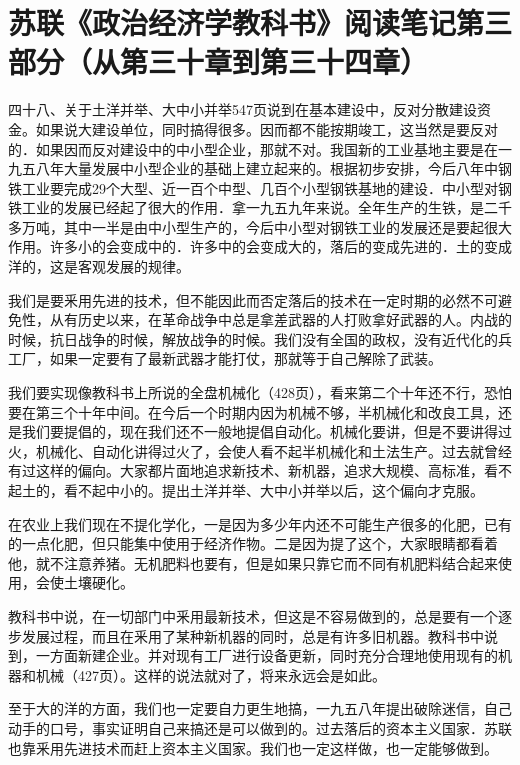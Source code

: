 \section[苏联《政治经济学教科书》阅读笔记第三部分（从第三十章到第三十四章）]{苏联《政治经济学教科书》阅读笔记第三部分（从第三十章到第三十四章）}


四十八、关于土洋并举、大中小并举547页说到在基本建设中，反对分散建设资金。如果说大建设单位，同时搞得很多。因而都不能按期竣工，这当然是要反对的．如果因而反对建设中的中小型企业，那就不对。我国新的工业基地主要是在一九五八年大量发展中小型企业的基础上建立起来的。根据初步安排，今后八年中钢铁工业要完成29个大型、近一百个中型、几百个小型钢铁基地的建设．中小型对钢铁工业的发展已经起了很大的作用．拿一九五九年来说。全年生产的生铁，是二千多万吨，其中一半是由中小型生产的，今后中小型对钢铁工业的发展还是要起很大作用。许多小的会变成中的．许多中的会变成大的，落后的变成先进的．土的变成洋的，这是客观发展的规律。

我们是要釆用先进的技术，但不能因此而否定落后的技术在一定时期的必然不可避免性，从有历史以来，在革命战争中总是拿差武器的人打败拿好武器的人。内战的时候，抗日战争的时候，解放战争的时候。我们没有全国的政权，没有近代化的兵工厂，如果一定要有了最新武器才能打仗，那就等于自己解除了武装。

我们要实现像教科书上所说的全盘机械化（428页），看来第二个十年还不行，恐怕要在第三个十年中间。在今后一个时期内因为机械不够，半机械化和改良工具，还是我们要提倡的，现在我们还不一般地提倡自动化。机械化要讲，但是不要讲得过火，机械化、自动化讲得过火了，会使人看不起半机械化和土法生产。过去就曾经有过这样的偏向。大家都片面地追求新技术、新机器，追求大规模、高标准，看不起土的，看不起中小的。提出土洋并举、大中小并举以后，这个偏向才克服。

在农业上我们现在不提化学化，一是因为多少年内还不可能生产很多的化肥，已有的一点化肥，但只能集中使用于经济作物。二是因为提了这个，大家眼睛都看着他，就不注意养猪。无机肥料也要有，但是如果只靠它而不同有机肥料结合起来使用，会使土壤硬化。

教科书中说，在一切部门中釆用最新技术，但这是不容易做到的，总是要有一个逐步发展过程，而且在釆用了某种新机器的同时，总是有许多旧机器。教科书中说到，一方面新建企业。并对现有工厂进行设备更新，同时充分合理地使用现有的机器和机械（427页）。这样的说法就对了，将来永远会是如此。

至于大的洋的方面，我们也一定要自力更生地搞，一九五八年提出破除迷信，自己动手的口号，事实证明自己来搞还是可以做到的。过去落后的资本主义国家．苏联也靠釆用先进技术而赶上资本主义国家。我们也一定这样做，也一定能够做到。

